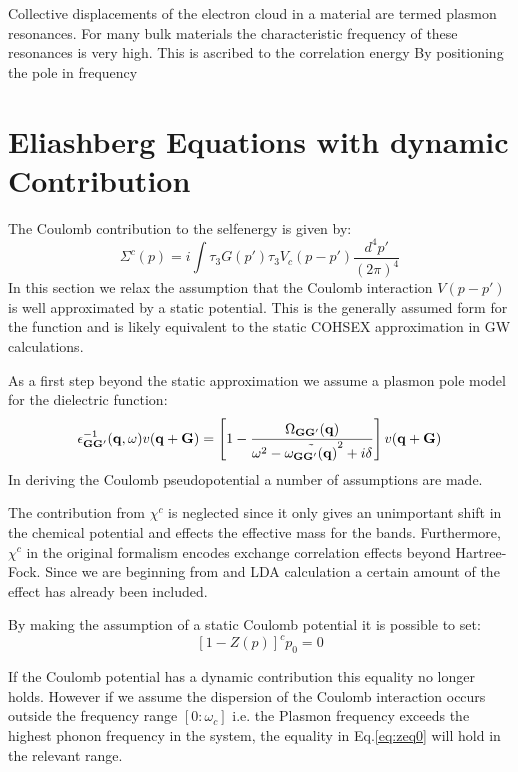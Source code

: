 Collective displacements of the electron cloud in a material are termed plasmon resonances.
For many bulk materials the characteristic frequency of these resonances is very  high.
This is ascribed to the correlation energy 
By positioning the pole in frequency 

\section{Eliashberg Equations with dynamic Contribution}

The Coulomb contribution to the selfenergy is given by:
%
\begin{equation}
\label{eq:selfeng}
\Sigma^{c}(p) = i \int \tau_{3} G(p') \tau_{3} V_{c}(p-p')\frac{d^{4}p'}{(2\pi)^{4}}
\end{equation}
%
In this section we relax the assumption that the Coulomb interaction $V(p-p')$
is well approximated by a static potential. This is the generally assumed form
for the function and is likely equivalent to the static COHSEX approximation in 
GW calculations.

As a first step beyond the static approximation we assume a plasmon pole 
model for the dielectric function:
%
\begin{equation}
\label{eq:ppm}
\epsilon_{{\bf G}{\bf G}'}^{-1}({\bf q},\omega)v({\bf q}+{\bf G}) = \left[1-\frac{\Omega_{{\bf G}{\bf G}'}({\bf q})}{\omega^{2}-\tilde{\omega_{{\bf G}{\bf G}'}({\bf q})}^{2} + i\delta}\right]v({\bf q}+{\bf G})
\end{equation}
%
In deriving the Coulomb pseudopotential a number of assumptions are made.

The contribution from $\chi^{c}$ is neglected since 
it only gives an unimportant shift in the chemical
potential and effects the effective mass for the bands. 
Furthermore, $\chi^{c}$ in the original
formalism encodes exchange correlation effects beyond 
Hartree-Fock. Since we are beginning from
and LDA calculation a certain amount of the 
effect has already been included.

By making the assumption of a static Coulomb potential it is possible to set:
%
\begin{equation}
\label{eq:zeq0}
\left[1 -Z(p)\right]^{c}p_{0} = 0
\end{equation}

If the Coulomb potential has a dynamic contribution this equality no longer holds. However if
we assume the dispersion of the Coulomb interaction occurs outside the frequency range $[0:\omega_{c}]$
i.e. the Plasmon frequency exceeds the highest phonon frequency in the system,
the equality in Eq.\ref{eq:zeq0} will hold in the relevant range.

